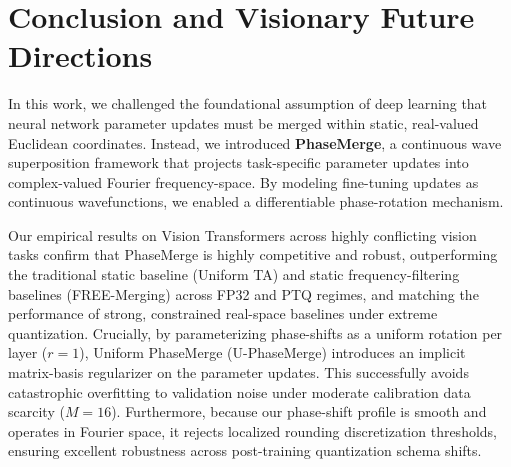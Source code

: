 \section{Conclusion and Visionary Future Directions}
\label{sec:conclusion}

In this work, we challenged the foundational assumption of deep learning that neural network parameter updates must be merged within static, real-valued Euclidean coordinates. Instead, we introduced \textbf{PhaseMerge}, a continuous wave superposition framework that projects task-specific parameter updates into complex-valued Fourier frequency-space. By modeling fine-tuning updates as continuous wavefunctions, we enabled a differentiable phase-rotation mechanism.

Our empirical results on Vision Transformers across highly conflicting vision tasks confirm that PhaseMerge is highly competitive and robust, outperforming the traditional static baseline (Uniform TA) and static frequency-filtering baselines (FREE-Merging) across FP32 and PTQ regimes, and matching the performance of strong, constrained real-space baselines under extreme quantization. Crucially, by parameterizing phase-shifts as a uniform rotation per layer ($r=1$), Uniform PhaseMerge (U-PhaseMerge) introduces an implicit matrix-basis regularizer on the parameter updates. This successfully avoids catastrophic overfitting to validation noise under moderate calibration data scarcity ($M=16$). Furthermore, because our phase-shift profile is smooth and operates in Fourier space, it rejects localized rounding discretization thresholds, ensuring excellent robustness across post-training quantization schema shifts.

